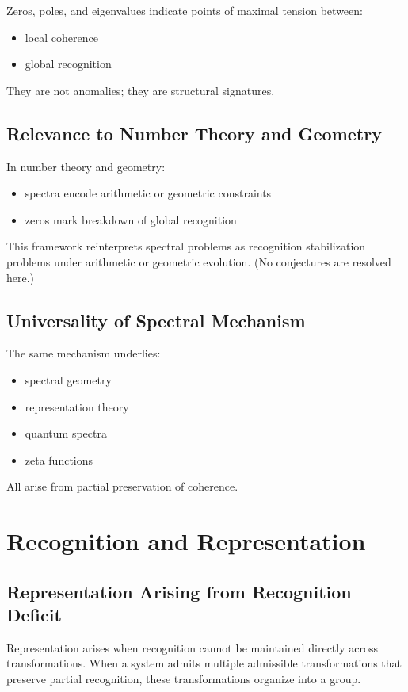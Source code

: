 \documentclass[12pt, oneside]{article}
\begin{document}
Zeros, poles, and eigenvalues indicate points of maximal tension between:
\begin{itemize}
    \item local coherence
    \item global recognition
\end{itemize}
They are not anomalies; they are structural signatures.

\subsection{Relevance to Number Theory and Geometry}

In number theory and geometry:
\begin{itemize}
    \item spectra encode arithmetic or geometric constraints
    \item zeros mark breakdown of global recognition
\end{itemize}
This framework reinterprets spectral problems as recognition stabilization problems under arithmetic or geometric evolution. (No conjectures are resolved here.)

\subsection{Universality of Spectral Mechanism}

The same mechanism underlies:
\begin{itemize}
    \item spectral geometry
    \item representation theory
    \item quantum spectra
    \item zeta functions
\end{itemize}
All arise from partial preservation of coherence.

\section{Recognition and Representation}

\subsection{Representation Arising from Recognition Deficit}

Representation arises when recognition cannot be maintained directly across transformations. When a system admits multiple admissible transformations that preserve partial recognition, these transformations organize into a group.
\end{document}
